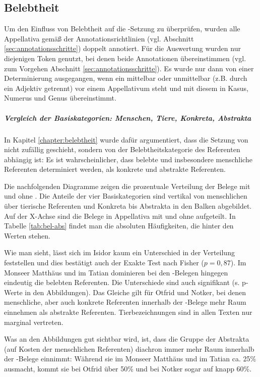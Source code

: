 \subsection{Belebtheit}\label{sec:ergeb-belebtheit}

Um den Einfluss von Belebtheit auf die -Setzung zu überprüfen, wurden alle Appellativa gemäß der Annotationsrichtlinien (vgl. Abschnitt  \ref{sec:annotationsschritte}) doppelt annotiert. Für die Auswertung wurden nur diejenigen Token genutzt, bei denen beide Annotationen übereinstimmen (vgl. zum Vorgehen Abschnitt \ref{sec:annotationsschritte}). Es wurde nur dann von einer Determinierung ausgegangen, wenn ein  mittelbar oder unmittelbar (z.B. durch ein Adjektiv getrennt) vor einem Appellativum steht und mit diesem in Kasus, Numerus und Genus  übereinstimmt.    

\subparagraph{Vergleich der Basiskategorien: Menschen, Tiere, Konkreta, Abstrakta}

In Kapitel \ref{chapter:belebtheit} wurde dafür argumentiert, dass die Setzung von  nicht zufällig geschieht, sondern von der Belebtheitskategorie des Referenten abhängig ist: Es ist wahrscheinlicher, dass belebte und insbesondere menschliche Referenten determiniert werden, als konkrete und abstrakte Referenten.

Die nachfolgenden Diagramme zeigen  die prozentuale Verteilung der Belege mit und ohne  . Die Anteile der vier Basiskategorien sind vertikal von menschlichen über tierische Referenten und Konkreta bis Abstrakta in den Balken abgebildet. Auf der X-Achse sind die Belege in Appellativa mit   und ohne   aufgeteilt.  In Tabelle \ref{tab:bel-abs} findet man die absoluten Häufigkeiten, die hinter den Werten stehen.

Wie man sieht, lässt sich im Isidor kaum ein Unterschied in der Verteilung feststellen und dies bestätigt auch der Exakte Test nach Fisher ($p = 0,87$). Im Monseer Matthäus und im Tatian dominieren bei den -Belegen hingegen eindeutig die belebten Referenten. Die Unterschiede sind auch signifikant (s. p-Werte in den Abbildungen). Das Gleiche gilt für Otfrid und Notker, bei denen menschliche, aber auch konkrete Referenten innerhalb der -Belege mehr Raum einnehmen als abstrakte Referenten. Tierbezeichnungen sind in allen Texten nur marginal vertreten.

Was an den Abbildungen gut sichtbar wird, ist, dass die Gruppe der Abstrakta (auf Kosten der menschlichen Referenten) diachron immer mehr Raum innerhalb der -Belege einnimmt: Während sie im Monseer Matthäus und im Tatian ca. 25\% ausmacht, kommt sie bei Otfrid über 50\% und bei Notker sogar auf knapp 60\%. 

